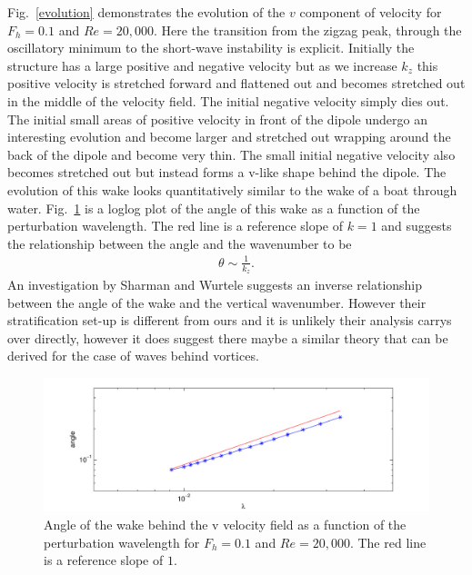 Fig.~\ref{evolution} demonstrates the evolution of the $v$ component of velocity for $F_{h}=0.1$ and $Re=20{,}000$. Here the transition from the zigzag peak, through the oscillatory minimum to the short-wave instability is explicit. Initially the structure has a large positive and negative velocity but as we increase $k_{z}$ this positive velocity is stretched forward and flattened out and becomes stretched out in the middle of the velocity field. The initial negative velocity simply dies out. The initial small areas of positive velocity in front of the dipole undergo an interesting evolution and become larger and stretched out wrapping around the back of the dipole and become very thin. The small initial negative velocity also becomes stretched out but instead forms a v-like shape behind the dipole. The evolution of this wake looks quantitatively similar to the wake of a boat through water. Fig.~\ref{wake} is a loglog plot of the angle of this wake as a function of the perturbation wavelength. The red line is a reference slope of $k=1$ and suggests the relationship between the angle and the wavenumber to be
\begin{align}
\theta \sim \frac{1}{k_{z}}.
\end{align} 
An investigation by Sharman and Wurtele \cite{sharman1983ship} suggests an inverse relationship between the angle of the wake and the vertical wavenumber. However their stratification set-up is different from ours and it is unlikely their analysis carrys over directly, however it does suggest there maybe a similar theory that can be derived for the case of waves behind vortices. 

\begin{figure}
\begin{center}
\includegraphics[width=\textwidth]{wake_fh_01_re_20000}
\caption{Angle of the wake behind the v velocity field as a function of the perturbation wavelength for $F_{h}=0.1$ and $Re=20{,}000$. The red line is a reference slope of $1$.}
\label{wake}
\end{center}
\end{figure}

